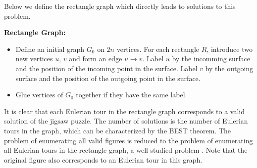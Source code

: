 \documentclass[a4paper]{article}
\begin{document}
Below we define the rectangle graph which directly leads to solutions to this problem.

\textbf{Rectangle Graph:}
\begin{itemize}
\item  Define an initial graph $G_0$ on $2n$ vertices. For each rectangle $R$, introduce two new vertices $u$, $v$ and form an edge $u \rightarrow v$.
Label $u$ by the incomming surface and the position of the incoming point in the surface.
Label $v$ by the outgoing surface and the position of the outgoing point
in the surface.
\item Glue vertices of $G_0$ together if they have the same label.
\end{itemize}

It is clear that each Eulerian tour in the rectangle graph corresponds to a valid solution of the jigsaw puzzle. The number of solutions is the number of
Eulerian tours in the graph, which can be characterized by the BEST \cite{best} theorem. The problem of enumerating all valid figures is reduced to the problem of enumerating
all Eulerian tours in the rectangle graph, a well studied problem \cite{abrham80}. 
Note that the original figure also corresponds to an Eulerian tour in this graph.  

\end{document}

